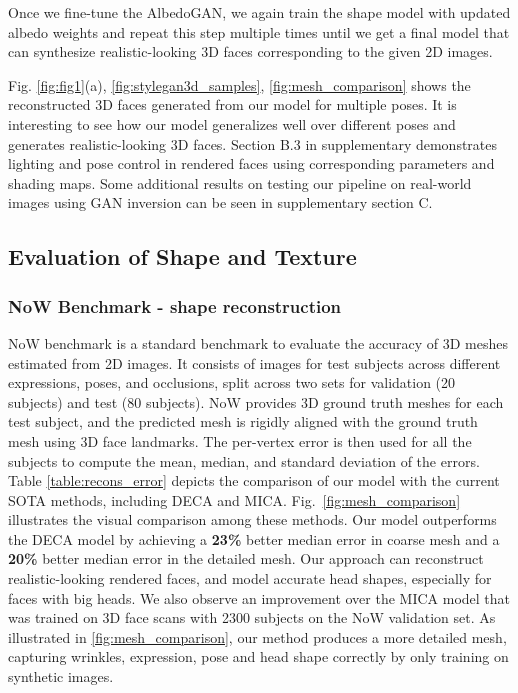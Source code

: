 \documentclass[10pt,twocolumn,letterpaper]{article}
\begin{document}
Once we fine-tune the AlbedoGAN, we again train the shape model with updated albedo weights and repeat this step multiple times until we get a final model that can synthesize realistic-looking 3D faces corresponding to the given 2D images.

Fig. \ref{fig:fig1}(a), \ref{fig:stylegan3d_samples}, \ref{fig:mesh_comparison} shows the reconstructed 3D faces generated from our model for multiple poses. It is interesting to see how our model generalizes well over different poses and generates realistic-looking 3D faces. Section B.3 in supplementary demonstrates lighting and pose control in rendered faces using corresponding parameters and shading maps. Some additional results on testing our pipeline on real-world images using GAN inversion can be seen in supplementary section C.
















\subsection{Evaluation of Shape and Texture}

\subsubsection{NoW Benchmark - shape reconstruction}

\vspace{-1mm}

NoW benchmark \cite{ringnet} is a standard benchmark to evaluate the accuracy of 3D meshes estimated from 2D images. It consists of  images for  test subjects across different expressions, poses, and occlusions, split across two sets for validation (20 subjects) and test (80 subjects). NoW provides 3D ground truth meshes for each test subject, and the predicted mesh is rigidly aligned with the ground truth mesh using 3D face landmarks. The per-vertex error is then used for all the subjects to compute the mean, median, and standard deviation of the errors. Table \ref{table:recons_error} depicts the comparison of our model with the current SOTA methods, including DECA and MICA.
Fig.~\ref{fig:mesh_comparison} illustrates the visual comparison among these methods.
Our model outperforms the DECA model by achieving a \textbf{23\%} better median error in coarse mesh and a \textbf{20\%} better median error in the detailed mesh.
Our approach can reconstruct realistic-looking rendered faces, and model accurate head shapes, especially for faces with big heads. 
We also observe an improvement over the MICA model that was trained on 3D face scans \cite{LYHM, stirling, facewarehouse} with 2300 subjects on the NoW validation set. As illustrated in \ref{fig:mesh_comparison}, our method produces a more detailed mesh, capturing wrinkles, expression, pose and head shape correctly by only training on synthetic images. 
\end{document}
